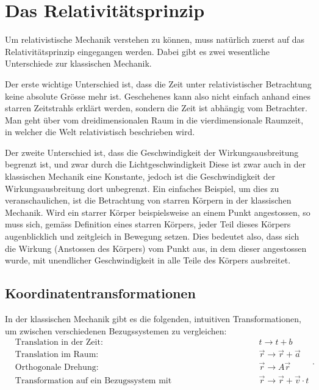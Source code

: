 
\section{Das Relativitätsprinzip 
\label{relativ:section:relativistik}}

Um relativistische Mechanik verstehen zu können,
muss natürlich zuerst auf das Relativitätsprinzip eingegangen werden.
Dabei gibt es zwei wesentliche Unterschiede zur klassischen Mechanik.

Der erste wichtige Unterschied ist, dass die Zeit unter relativistischer Betrachtung keine absolute Grösse mehr ist.
Geschehenes kann also nicht einfach anhand eines starren Zeitstrahls erklärt werden, sondern die Zeit ist abhängig vom Betrachter.
Man geht über vom dreidimensionalen Raum in die vierdimensionale Raumzeit, in welcher die Welt relativistisch beschrieben wird.

Der zweite Unterschied ist,
dass die Geschwindigkeit der Wirkungsausbreitung begrenzt ist,
und zwar durch die Lichtgeschwindigkeit
Diese ist zwar auch in der klassischen Mechanik eine Konstante,
jedoch ist die Geschwindigkeit der Wirkungsausbreitung dort unbegrenzt.
Ein einfaches Beispiel, um dies zu veranschaulichen,
ist die Betrachtung von starren Körpern in der klassischen Mechanik.
Wird ein starrer Körper beispielsweise an einem Punkt angestossen,
so muss sich, gemäss Definition eines starren Körpers,
jeder Teil dieses Körpers augenblicklich und zeitgleich in Bewegung setzen.
Dies bedeutet also, dass sich die Wirkung (Anstossen des Körpers)
vom Punkt aus, in dem dieser angestossen wurde,
mit unendlicher Geschwindigkeit in alle Teile des Körpers ausbreitet.


\subsection{Koordinatentransformationen 
\label{relativ:section:koordtrafo}}

In der klassischen Mechanik gibt es die folgenden,
intuitiven Transformationen, um zwischen verschiedenen Bezugssystemen
zu vergleichen:
\[
\begin{aligned}
    &\text{Translation in der Zeit: } && t \rightarrow t + b \\
    &\text{Translation im Raum: } && \vec{r} \rightarrow \vec{r} + \vec{a} \\
    &\text{Orthogonale Drehung: } && \vec{r} \rightarrow A \vec{r} \\
    &\text{Transformation auf ein Bezugssystem mit Relativgeschwindigkeit: } && \vec{r} \rightarrow \vec{r} + \vec{v} \cdot t
\end{aligned}.
\]

